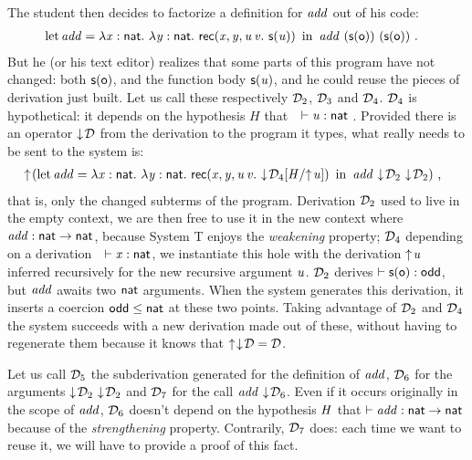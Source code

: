 \documentclass{llncs}
\begin{document}
The student then decides to factorize a definition for $\text{\textit{add}}$ out
of his code:
\begin{align*}
  &\operatorname{let}{{\text{\textit{add}}}}={\lambda{\ensuremath{\text{\textit{x}}}}:{\text{\textsf{nat}}}.\  \lambda{\ensuremath{\text{\textit{y}}}}:{\text{\textsf{nat}}}.\  \text{\textsf{rec}}({\text{\textit{x}}},{\text{\textit{y}}},{\text{\textit{u}}}\,{\text{\textit{v}}}.\ {\text{\textsf{s}} ({\text{\textit{u}}})})}\ \operatorname{in}\ 
  {\text{\textit{add}}}\ {(\text{\textsf{s}} ({\text{\textsf{o}}}))}\ {(\text{\textsf{s}} ({\text{\textsf{o}}}))} \ \text{.}
\end{align*}
But he (or his text editor) realizes that some parts of this program
have not changed: both $\text{\textsf{s}} ({\text{\textsf{o}}})$, and the function body $\text{\textsf{s}} ({\text{\textit{u}}})$, and
he could reuse the pieces of derivation just built. Let us call these
respectively $\mathcal D_2$, $\mathcal D_3$ and $\mathcal D_4$. $\mathcal D_4$ is hypothetical: it
depends on the hypothesis $H$ that\ \ $\vdash \text{\textit{u}}:\text{\textsf{nat}}$ .
Provided there is an operator $\downarrow\!{\mathcal D}$ from the derivation to the
program it types, what really needs to be sent to the system is:
\begin{align*}
  &\uparrow\!{}(
    \operatorname{let}{{\text{\textit{add}}}}={\lambda{\ensuremath{\text{\textit{x}}}}:{\text{\textsf{nat}}}.\  \lambda{\ensuremath{\text{\textit{y}}}}:{\text{\textsf{nat}}}.\  \text{\textsf{rec}}({\text{\textit{x}}},{\text{\textit{y}}},{\text{\textit{u}}}\,{\text{\textit{v}}}.\ {\downarrow\!{{\mathcal D_4}[{{\text{\textit{H}}}/{\uparrow\!{\text{\textit{u}}}}}]}})}\ \operatorname{in}\ 
    {\text{\textit{add}}}\ {\downarrow\!{\mathcal D_2}}\ {\downarrow\!{\mathcal D_2}}
  )
\ \text{,}
\end{align*}
that is, only the changed subterms of the program. Derivation $\mathcal D_2$
used to live in the empty context, we are then free to use it in the
new context where $\text{\textit{add}}:\text{\textsf{nat}}\to\text{\textsf{nat}}$, because System
\sysname T enjoys the \emph{weakening} property; $\mathcal D_4$ depending on
a derivation\ \ $\vdash\text{\textit{x}}:\text{\textsf{nat}}$, we instantiate this hole
with the derivation $\uparrow\!{\text{\textit{u}}}$ inferred recursively for the new
recursive argument $\text{\textit{u}}$. $\mathcal D_2$ derives $\vdash \text{\textsf{s}} ({\text{\textsf{o}}}) :
\text{\textsf{odd}}$, but $\text{\textit{add}}$ awaits two $\text{\textsf{nat}}$ arguments. When the
system generates this derivation, it inserts a coercion $\text{\textsf{odd}}
\leq \text{\textsf{nat}}$ at these two points. Taking advantage of $\mathcal D_2$ and
$\mathcal D_4$ the system succeeds with a new derivation made out of these,
without having to regenerate them because it knows that
$\uparrow\!{\downarrow\!{\mathcal D}} = \mathcal D$.

Let us call $\mathcal D_5$ the subderivation generated for the definition of
$\text{\textit{add}}$, $\mathcal D_6$ for the arguments
${\downarrow\!{\mathcal D_2}}\ {\downarrow\!{\mathcal D_2}}$ and $\mathcal D_7$ for the call
${\text{\textit{add}}}\  {\downarrow\!{\mathcal D_6}}$. Even if it occurs originally in the
scope of $\text{\textit{add}}$, $\mathcal D_6$ doesn't depend on the hypothesis $\text{\textit{H}}$ that $\vdash \text{\textit{add}}:\text{\textsf{nat}}\to\text{\textsf{nat}}$ because of the
\emph{strengthening} property. Contrarily, $\mathcal D_7$ does: each time we
want to reuse it, we will have to provide a proof of this fact.
\end{document}
